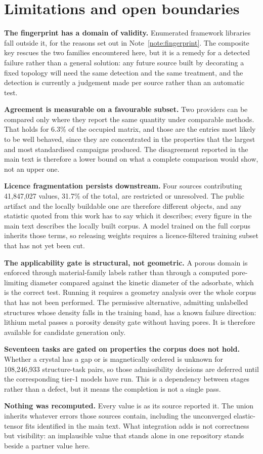 \section{Limitations and open boundaries}\label{note:limits}

\textbf{The fingerprint has a domain of validity.} Enumerated framework libraries
fall outside it, for the reasons set out in Note~\ref{note:fingerprint}. The
composite key rescues the two families encountered here, but it is a remedy for a
detected failure rather than a general solution: any future source built by
decorating a fixed topology will need the same detection and the same treatment,
and the detection is currently a judgement made per source rather than an
automatic test.

\textbf{Agreement is measurable on a favourable subset.} Two providers can be
compared only where they report the same quantity under comparable methods. That
holds for 6.3\% of the occupied matrix, and those are the entries most likely to
be well behaved, since they are concentrated in the properties that the largest
and most standardised campaigns produced. The disagreement reported in the main
text is therefore a lower bound on what a complete comparison would show, not an
upper one.

\textbf{Licence fragmentation persists downstream.} Four sources contributing
41{,}847{,}027 values, 31.7\% of the total, are restricted or unresolved. The public
artifact and the locally buildable one are therefore different objects, and any
statistic quoted from this work has to say which it describes; every figure in
the main text describes the locally built corpus. A model trained on the full
corpus inherits those terms, so releasing weights requires a licence-filtered
training subset that has not yet been cut.

\textbf{The applicability gate is structural, not geometric.} A porous domain is
enforced through material-family labels rather than through a computed
pore-limiting diameter compared against the kinetic diameter of the adsorbate,
which is the correct test. Running it requires a geometry analysis over the whole
corpus that has not been performed. The permissive alternative, admitting
unlabelled structures whose density falls in the training band, has a known
failure direction: lithium metal passes a porosity density gate without having
pores. It is therefore available for candidate generation only.

\textbf{Seventeen tasks are gated on properties the corpus does not hold.}
Whether a crystal has a gap or is magnetically ordered is unknown for
108{,}246{,}933 structure-task pairs, so those admissibility decisions are
deferred until the corresponding tier-1 models have run. This is a dependency
between stages rather than a defect, but it means the completion is not a single
pass.

\textbf{Nothing was recomputed.} Every value is as its source reported it. The
union inherits whatever errors those sources contain, including the unconverged
elastic-tensor fits identified in the main text. What integration
adds is not correctness but visibility: an implausible value that stands alone in
one repository stands beside a partner value here.
